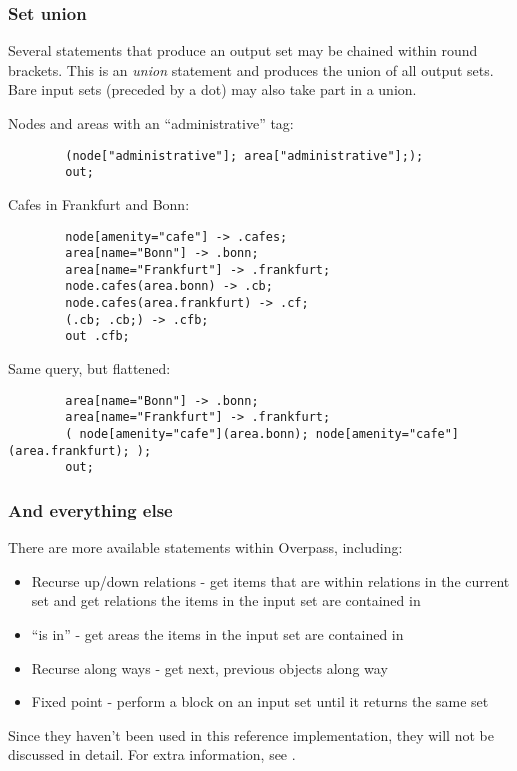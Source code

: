 \documentclass[main.tex]{subfiles}
\begin{document}
\subsubsection{Set union}
Several statements that produce an output set may be chained within round
brackets. This is an \emph{union} statement and produces the union of all
output sets. Bare input sets (preceded by a dot) may also take part in a union.

\begin{example}
    Nodes and areas with an ``administrative'' tag:
    \begin{lstlisting}
        (node["administrative"]; area["administrative"];);
        out;
    \end{lstlisting}

    Cafes in Frankfurt and Bonn:
    \begin{lstlisting}
        node[amenity="cafe"] -> .cafes;
        area[name="Bonn"] -> .bonn;
        area[name="Frankfurt"] -> .frankfurt;
        node.cafes(area.bonn) -> .cb;
        node.cafes(area.frankfurt) -> .cf;
        (.cb; .cb;) -> .cfb;
        out .cfb;
    \end{lstlisting}

    Same query, but flattened:
    \begin{lstlisting}
        area[name="Bonn"] -> .bonn;
        area[name="Frankfurt"] -> .frankfurt;
        ( node[amenity="cafe"](area.bonn); node[amenity="cafe"](area.frankfurt); );
        out;
    \end{lstlisting}
\end{example}

\subsubsection{And everything else}
There are more available statements within Overpass, including:
\begin{itemize}
    \item Recurse up/down relations - get items that are within relations in the
        current set and get relations the items in the input set are contained
        in
    \item ``is in'' - get areas the items in the input set are contained in
    \item Recurse along ways - get next, previous objects along way
    \item Fixed point - perform a block on an input set until it returns the
        same set
\end{itemize}

Since they haven't been used in this reference implementation, they will not be
discussed in detail. For extra information, see \cite{overpassql}.
\end{document}
